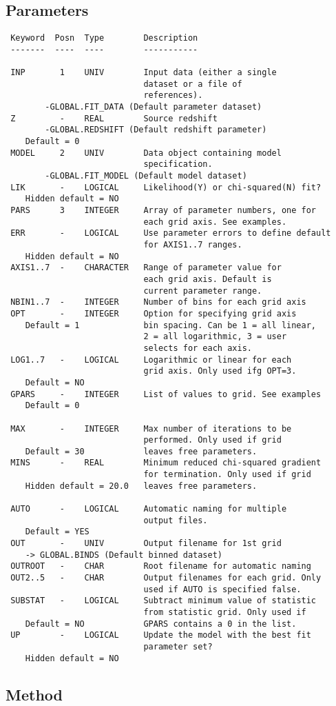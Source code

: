 \documentclass{book}
\renewcommand{\_}{{\tt\char'137}}     %
\begin{document}
\subsection{Parameters}
\begin{verbatim}
 Keyword  Posn  Type        Description
 -------  ----  ----        -----------

 INP       1    UNIV        Input data (either a single
                            dataset or a file of
                            references).
        -GLOBAL.FIT_DATA (Default parameter dataset)
 Z         -    REAL        Source redshift
        -GLOBAL.REDSHIFT (Default redshift parameter)
    Default = 0
 MODEL     2    UNIV        Data object containing model
                            specification.
        -GLOBAL.FIT_MODEL (Default model dataset)
 LIK       -    LOGICAL     Likelihood(Y) or chi-squared(N) fit?
    Hidden default = NO
 PARS      3    INTEGER     Array of parameter numbers, one for
                            each grid axis. See examples.
 ERR       -    LOGICAL     Use parameter errors to define default
                            for AXIS1..7 ranges.
    Hidden default = NO
 AXIS1..7  -    CHARACTER   Range of parameter value for
                            each grid axis. Default is
                            current parameter range.
 NBIN1..7  -    INTEGER     Number of bins for each grid axis
 OPT       -    INTEGER     Option for specifying grid axis
    Default = 1             bin spacing. Can be 1 = all linear,
                            2 = all logarithmic, 3 = user
                            selects for each axis.
 LOG1..7   -    LOGICAL     Logarithmic or linear for each
                            grid axis. Only used ifg OPT=3.
    Default = NO
 GPARS     -    INTEGER     List of values to grid. See examples
    Default = 0

 MAX       -    INTEGER     Max number of iterations to be
                            performed. Only used if grid
    Default = 30            leaves free parameters.
 MINS      -    REAL        Minimum reduced chi-squared gradient
                            for termination. Only used if grid
    Hidden default = 20.0   leaves free parameters.

 AUTO      -    LOGICAL     Automatic naming for multiple
                            output files.
    Default = YES
 OUT       -    UNIV        Output filename for 1st grid
    -> GLOBAL.BINDS (Default binned dataset)
 OUTROOT   -    CHAR        Root filename for automatic naming
 OUT2..5   -    CHAR        Output filenames for each grid. Only
                            used if AUTO is specified false.
 SUBSTAT   -    LOGICAL     Subtract minimum value of statistic
                            from statistic grid. Only used if
    Default = NO            GPARS contains a 0 in the list.
 UP        -    LOGICAL     Update the model with the best fit
                            parameter set?
    Hidden default = NO

\end{verbatim}\subsection{Method}
\end{document}
